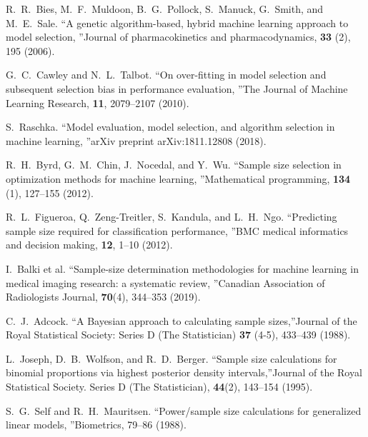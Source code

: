 \documentclass[
11pt,%
tightenlines,%
twoside,%
onecolumn,%
nofloats,%
nobibnotes,%
nofootinbib,%
superscriptaddress,%
noshowpacs,%
centertags]%
{revtex4-2}
\begin{document}
\begin{thebibliography}{99}

R.~R.~Bies, M.~F.~Muldoon, B.~G.~Pollock, S.~Manuck, G.~Smith, and M.~E.~Sale. \textquotedblleft A genetic algorithm-based, hybrid machine learning approach to model selection, \textquotedblright Journal of pharmacokinetics and pharmacodynamics, \textbf{33} (2), 195 (2006).

G.~C.~Cawley and N.~L.~Talbot. \textquotedblleft On over-fitting in model selection and subsequent selection bias in performance evaluation, \textquotedblright The Journal of Machine Learning Research, \textbf{11}, 2079--2107 (2010).

S.~Raschka. \textquotedblleft Model evaluation, model selection, and algorithm selection in machine learning, \textquotedblright arXiv preprint arXiv:1811.12808 (2018).

R.~H.~Byrd, G.~M.~Chin, J.~Nocedal, and Y.~Wu. \textquotedblleft Sample size selection in optimization methods for machine learning, \textquotedblright Mathematical programming, \textbf{134} (1), 127--155 (2012).

R.~L.~Figueroa, Q.~Zeng-Treitler, S.~Kandula, and L.~H.~Ngo. \textquotedblleft Predicting sample size required for classification performance, \textquotedblright BMC medical informatics and decision making, \textbf{12}, 1--10 (2012).

I.~Balki et al. \textquotedblleft Sample-size determination methodologies for machine learning in medical imaging research: a systematic review, \textquotedblright Canadian Association of Radiologists Journal, \textbf{70}(4), 344--353 (2019).

C.~J.~Adcock. \textquotedblleft A Bayesian approach to calculating sample sizes,\textquotedblright Journal of the Royal Statistical Society: Series D (The Statistician) \textbf{37} (4-5), 433--439 (1988).

L.~Joseph, D.~B.~Wolfson, and R.~D.~Berger. \textquotedblleft Sample size calculations for binomial proportions via highest posterior density intervals,\textquotedblright Journal of the Royal Statistical Society. Series D (The Statistician), \textbf{44}(2), 143--154 (1995).

S.~G.~Self and R.~H.~Mauritsen. \textquotedblleft Power/sample size calculations for generalized linear models, \textquotedblright Biometrics, 79--86 (1988).


\end{thebibliography}
\end{document}
